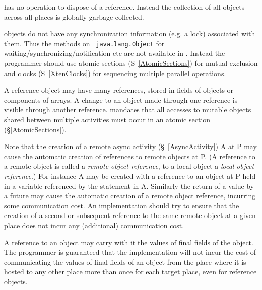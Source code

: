 {}\Xten{} has no operation to dispose of a reference.  Instead the
collection of all objects across all places is globally garbage
collected.

{}\Xten{} objects do not have any synchronization information (e.g.{}
a lock) associated with them. Thus the methods on {\tt
java.lang.Object} for waiting/synchronizing/notification etc are not
available in \Xten. Instead the programmer should use atomic sections
(S~\ref{AtomicSections}) for mutual exclusion and clocks
(S~\ref{XtenClocks}) for sequencing multiple parallel operations.

A reference object may have many references, stored in fields of
objects or components of arrays. A change to an object made through
one reference is visible through another reference. \Xten{} mandates
that all accesses to mutable objects shared between multiple
activities must occur in an atomic section (\S\ref{AtomicSections}).

Note that the creation of a remote async activity
(\S~\ref{AsyncActivity}) {\cf A} at {\cf P} may cause the automatic creation of
references to remote objects at {\cf P}. (A reference to a remote
object is called a {\em remote object reference}, to a local object a
{\em local object reference}.)  For instance {\cf A} may be created
with a reference to an object at {\cf P} held in a variable referenced
by the statement in {\cf A}.  Similarly the return of a value by a
{\cf future} may cause the automatic creation of a remote object
reference, incurring some communication cost.  An {}\Xten{}
implementation should try to ensure that the creation of a second or
subsequent reference to the same remote object at a given place does
not incur any (additional) communication cost.

A reference to an object may carry with it the values of final fields
of the object. The programmer is guaranteed that the implementation
will not incur the cost of communicating the values of final fields of
an object from the place where it is hosted to any other place more
than once for each target place, even for reference objects.

